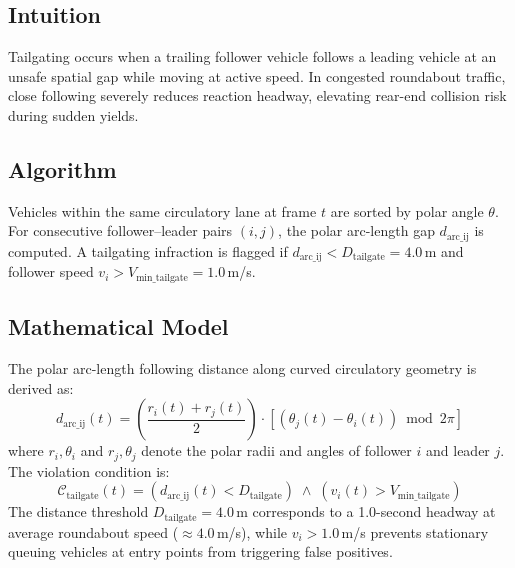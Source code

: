 \subsection{Intuition}
Tailgating occurs when a trailing follower vehicle follows a leading vehicle at an unsafe spatial gap while moving at active speed. In congested roundabout traffic, close following severely reduces reaction headway, elevating rear-end collision risk during sudden yields.

\subsection{Algorithm}
Vehicles within the same circulatory lane at frame $t$ are sorted by polar angle $\theta$. For consecutive follower--leader pairs $(i, j)$, the polar arc-length gap $d_{\text{arc\_ij}}$ is computed. A tailgating infraction is flagged if $d_{\text{arc\_ij}} < D_{\text{tailgate}} = 4.0$\,m and follower speed $v_i > V_{\text{min\_tailgate}} = 1.0$\,m/s.

\subsection{Mathematical Model}
The polar arc-length following distance along curved circulatory geometry is derived as:
\begin{equation}
    d_{\text{arc\_ij}}(t) = \left(\frac{r_i(t) + r_j(t)}{2}\right) \cdot \left[(\theta_j(t) - \theta_i(t)) \bmod 2\pi\right]
\end{equation}
where $r_i, \theta_i$ and $r_j, \theta_j$ denote the polar radii and angles of follower $i$ and leader $j$. The violation condition is:
\begin{equation}
    \mathcal{C}_{\text{tailgate}}(t) = \left( d_{\text{arc\_ij}}(t) < D_{\text{tailgate}} \right) \;\land\; \left( v_i(t) > V_{\text{min\_tailgate}} \right)
\end{equation}
The distance threshold $D_{\text{tailgate}} = 4.0$\,m corresponds to a 1.0-second headway at average roundabout speed ($\approx 4.0$\,m/s), while $v_i > 1.0$\,m/s prevents stationary queuing vehicles at entry points from triggering false positives.

